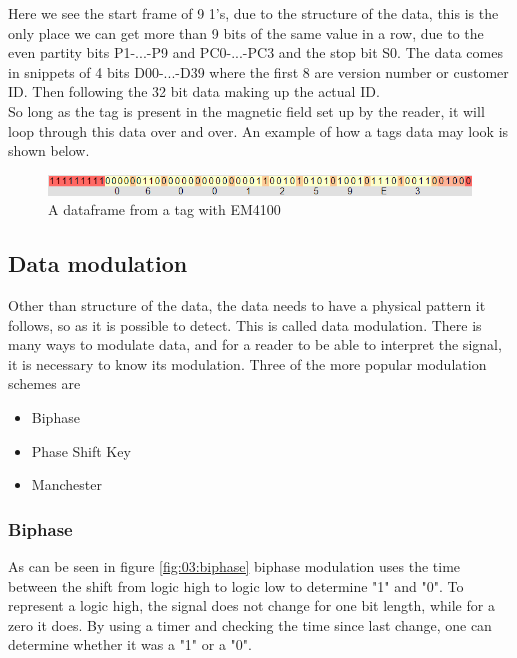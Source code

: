 Here we see the start frame of 9 1's, due to the structure of the data, this is the only place we can get more than 9 bits of the same value in a row, due to the even partity bits P1-...-P9 and PC0-...-PC3 and the stop bit S0. The data comes in snippets of 4 bits D00-...-D39 where the first 8 are version number or customer ID. Then following the 32 bit data making up the actual ID.\\

So long as the tag is present in the magnetic field set up by the reader, it will loop through this data over and over. An example of how a tags data may look is shown below.
\begin{figure}[H]
    \centering
    \includegraphics[width=\textwidth]{03_Theory/figures/Dataframe.png}
    \caption{A dataframe from a tag with EM4100}
    \label{fig:03:Dataframe}
\end{figure}

\subsection{Data modulation}

Other than structure of the data, the data needs to have a physical pattern it follows, so as it is possible to detect. This is called data modulation. There is many ways to modulate data, and for a reader to be able to interpret the signal, it is necessary to know its modulation. Three of the more popular modulation schemes are 

\begin{itemize}
    \item Biphase
    \item Phase Shift Key
    \item Manchester
\end{itemize}



\subsubsection{Biphase}
As can be seen in figure \ref{fig:03:biphase} biphase modulation uses the time between the shift from logic high to logic low to determine "1" and "0". To represent a logic high, the signal does not change for one bit length, while for a zero it does. By using  a timer and checking the time since last change, one can determine whether it was a "1" or a "0".

